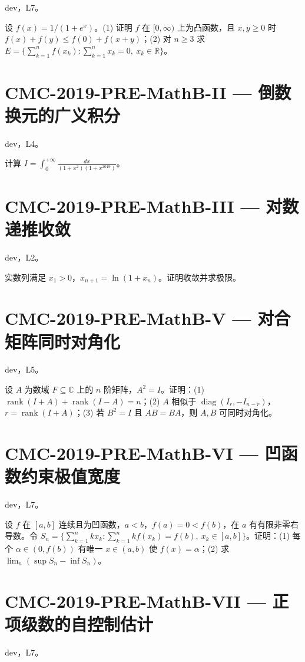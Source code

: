 \documentclass[UTF8]{ctexart}
\begin{document}
dev，L7。

设 $f(x)=1/(1+e^x)$。(1) 证明 $f$ 在 $[0,\infty)$ 上为凸函数，且 $x,y\ge0$ 时 $f(x)+f(y)\le f(0)+f(x+y)$；(2) 对 $n\ge3$ 求 $E=\{\sum_{k=1}^n f(x_k):\sum_{k=1}^n x_k=0,\ x_k\in\mathbb R\}$。

\section*{CMC-2019-PRE-MathB-II — 倒数换元的广义积分}

dev，L4。

计算 $\displaystyle I=\int_0^{+\infty}\frac{dx}{(1+x^2)(1+x^{2019})}$。

\section*{CMC-2019-PRE-MathB-III — 对数递推收敛}

dev，L2。

实数列满足 $x_1>0$，$x_{n+1}=\ln(1+x_n)$。证明收敛并求极限。

\section*{CMC-2019-PRE-MathB-V — 对合矩阵同时对角化}

dev，L5。

设 $A$ 为数域 $F\subseteq\mathbb C$ 上的 $n$ 阶矩阵，$A^2=I$。证明：(1) $\operatorname{rank}(I+A)+\operatorname{rank}(I-A)=n$；(2) $A$ 相似于 $\operatorname{diag}(I_r,-I_{n-r})$，$r=\operatorname{rank}(I+A)$；(3) 若 $B^2=I$ 且 $AB=BA$，则 $A,B$ 可同时对角化。

\section*{CMC-2019-PRE-MathB-VI — 凹函数约束极值宽度}

dev，L7。

设 $f$ 在 $[a,b]$ 连续且为凹函数，$a<b$，$f(a)=0<f(b)$，在 $a$ 有有限非零右导数。令 $S_n=\{\sum_{k=1}^n kx_k:\sum_{k=1}^n kf(x_k)=f(b),\ x_k\in[a,b]\}$。证明：(1) 每个 $\alpha\in(0,f(b))$ 有唯一 $x\in(a,b)$ 使 $f(x)=\alpha$；(2) 求 $\lim_n(\sup S_n-\inf S_n)$。

\section*{CMC-2019-PRE-MathB-VII — 正项级数的自控制估计}

dev，L7。
\end{document}
